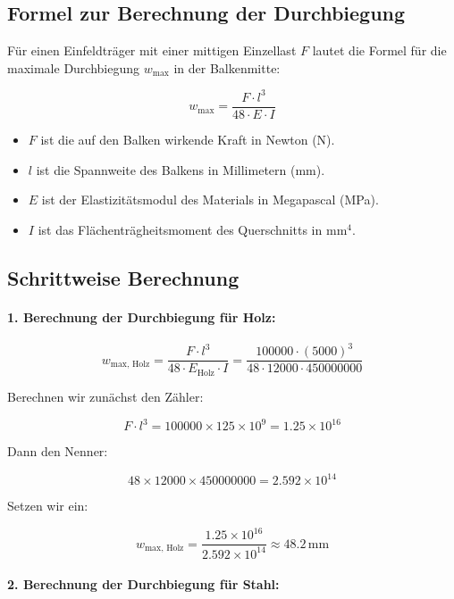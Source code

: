 \subsection*{Formel zur Berechnung der Durchbiegung}

Für einen Einfeldträger mit einer mittigen Einzellast \( F \) lautet die Formel für die maximale Durchbiegung \( w_{\text{max}} \) in der Balkenmitte:

\[
w_{\text{max}} = \frac{F \cdot l^3}{48 \cdot E \cdot I}
\]

\begin{itemize}
  \item \( F \) ist die auf den Balken wirkende Kraft in Newton (N).
  \item \( l \) ist die Spannweite des Balkens in Millimetern (mm).
  \item \( E \) ist der Elastizitätsmodul des Materials in Megapascal (MPa).
  \item \( I \) ist das Flächenträgheitsmoment des Querschnitts in \(\mathrm{mm}^4\).
\end{itemize}

\subsection*{Schrittweise Berechnung}

\paragraph{1. Berechnung der Durchbiegung für Holz:}

\[
w_{\text{max, Holz}} = \frac{F \cdot l^3}{48 \cdot E_{\text{Holz}} \cdot I}
= \frac{100000 \cdot (5000)^3}{48 \cdot 12000 \cdot 450000000}
\]

Berechnen wir zunächst den Zähler:

\[
F \cdot l^3 = 100000 \times 125 \times 10^9 = 1.25 \times 10^{16}
\]

Dann den Nenner:

\[
48 \times 12000 \times 450000000 = 2.592 \times 10^{14}
\]

Setzen wir ein:

\[
w_{\text{max, Holz}} = \frac{1.25 \times 10^{16}}{2.592 \times 10^{14}} \approx 48.2\, \mathrm{mm}
\]

\paragraph{2. Berechnung der Durchbiegung für Stahl:}

